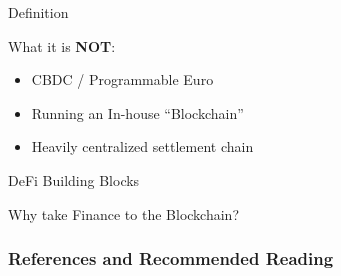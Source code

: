 \documentclass[handout]{beamer}
\begin{document}


\begin{frame}{Definition}

What it is \textbf{NOT}:
	\vspace{3em}
	\begin{itemize}
		\item<2-> CBDC / Programmable Euro
		\item<3-> Running an In-house “Blockchain”
		\item<4-> Heavily centralized settlement chain
	\end{itemize}
	
\end{frame}


\begin{frame}{DeFi Building Blocks}
	\scalebox{0.7}{
	\begin{tikzpicture}
	
	\end{tikzpicture}
	}
\end{frame}


\begin{frame}{Why take Finance to the Blockchain?}
	
	\scalebox{0.85}{
	\begin{tikzpicture}
		
		
	\end{tikzpicture}
	}
\end{frame}



\begin{frame}%
\frametitle{References and Recommended Reading}
\nocite{FS:21}
	
	
 
\end{frame}
\end{document}

